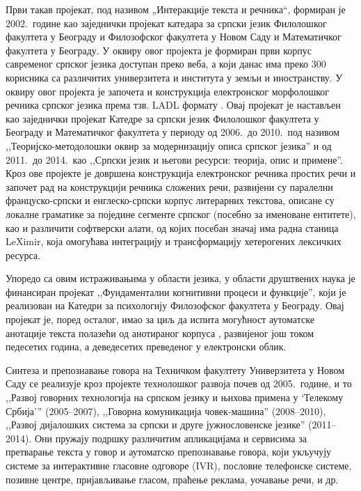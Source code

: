 \begin{multicols}{2}
Први такав пројекат, под називом „Интеракције текста и речника“, формиран је 2002.~године као заједнички пројекат катедара за српски језик Филолошког факултета у Београду и Филозофског факултета у Новом Саду и Математичког факултета у Београду. У оквиру овог пројекта је формиран први корпус савременог српског језика \cite{KORPUS} доступан преко веба, а који данас има преко 300 корисника са различитих универзитета и института у земљи и иностранству. У оквиру овог пројекта је започета и конструкција електронског морфолошког речника српског језика према тзв. LADL формату \cite{KRSTEV}. Овај пројекат је настављен као заједнички пројекат Катедре за српски језик Филолошког факултета у Београду и Математичког факултета у периоду од 2006.~до 2010.~под називом ,,Теоријско-методолошки оквир за модернизацију описа српског језика'' и од 2011.~до 2014.~као ,,Српски језик и његови ресурси: теорија, опис и примене''. Кроз ове пројекте је довршена конструкција електронског речника простих речи и започет рад на конструкцији речника сложених речи, развијени су паралелни француско-српски и енглеско-српски корпус литерарних текстова, описане су локалне граматике за поједине сегменте српског (посебно за именоване ентитете), као и различити софтверски алати, од којих посебан значај има радна станица LeXimir, која омогућава интеграцију и трансформацију хетерогених лексичких ресурса. 

Упоредо са овим истраживањима у области језика, у области друштвених наука је финансиран пројекат ,,Фундаментални когнитивни процеси и функције'', који је реализован на Катедри за психологију Филозофског факултета у Београду. Овај пројекат је, поред осталог, имао за циљ да испита могућност аутоматске анотације текста полазећи од анотираног корпуса \cite{SRB_KORPUS}, развијеног још током педесетих година, а деведесетих преведеног у електронски облик. 

Синтеза и препознавање говора на Техничком факултету Универзитета у Новом Саду се реализује кроз пројекте технолошког развоја почев од 2005.~године, и то ,,Развој говорних технологија на српском језику и њихова примена у ‘Телекому Србија’'' (2005--2007), ,,Говорна комуникација човек-машина'' (2008--2010),  ,,Развој дијалошких система за српски и друге јужнословенске језике'' (2011--2014).  Они пружају подршку различитим апликацијама и сервисима за претварање текста у говор и аутоматско препознавање говора, који укључују системе за интерактивне гласовне одговоре (IVR), пословне телефонске системе, позивне центре, пријављивање гласом, праћење реклама, уочавање речи, и др.


\end{multicols}
